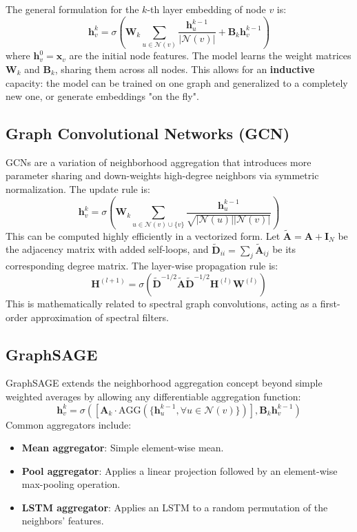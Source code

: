 The general formulation for the $k$-th layer embedding of node $v$ is:
\begin{equation}
    \mathbf{h}_v^k = \sigma \left( \mathbf{W}_k \sum_{u \in \mathcal{N}(v)} \frac{\mathbf{h}_u^{k-1}}{|\mathcal{N}(v)|} + \mathbf{B}_k \mathbf{h}_v^{k-1} \right)
\end{equation}
where $\mathbf{h}_v^0 = \mathbf{x}_v$ are the initial node features. The model learns the weight matrices $\mathbf{W}_k$ and $\mathbf{B}_k$, sharing them across all nodes. This allows for an \textbf{inductive} capacity: the model can be trained on one graph and generalized to a completely new one, or generate embeddings "on the fly".

\subsection{Graph Convolutional Networks (GCN)}
GCNs are a variation of neighborhood aggregation that introduces more parameter sharing and down-weights high-degree neighbors via symmetric normalization. The update rule is:
\begin{equation}
    \mathbf{h}_v^k = \sigma \left( \mathbf{W}_k \sum_{u \in \mathcal{N}(v) \cup \{v\}} \frac{\mathbf{h}_u^{k-1}}{\sqrt{|\mathcal{N}(u)| |\mathcal{N}(v)|}} \right)
\end{equation}
This can be computed highly efficiently in a vectorized form. Let $\tilde{\mathbf{A}} = \mathbf{A} + \mathbf{I}_N$ be the adjacency matrix with added self-loops, and $\tilde{\mathbf{D}}_{ii} = \sum_j \tilde{\mathbf{A}}_{ij}$ be its corresponding degree matrix. The layer-wise propagation rule is:
\begin{equation}
    \mathbf{H}^{(l+1)} = \sigma \left( \tilde{\mathbf{D}}^{-1/2} \tilde{\mathbf{A}} \tilde{\mathbf{D}}^{-1/2} \mathbf{H}^{(l)} \mathbf{W}^{(l)} \right)
\end{equation}
This is mathematically related to spectral graph convolutions, acting as a first-order approximation of spectral filters.

\subsection{GraphSAGE}
GraphSAGE extends the neighborhood aggregation concept beyond simple weighted averages by allowing any differentiable aggregation function:
\begin{equation}
    \mathbf{h}_v^k = \sigma \left( \left[ \mathbf{A}_k \cdot \text{AGG}(\{\mathbf{h}_u^{k-1}, \forall u \in \mathcal{N}(v)\}) \right] , \mathbf{B}_k \mathbf{h}_v^{k-1} \right)
\end{equation}
Common aggregators include:
\begin{itemize}
    \item \textbf{Mean aggregator}: Simple element-wise mean.
    \item \textbf{Pool aggregator}: Applies a linear projection followed by an element-wise max-pooling operation.
    \item \textbf{LSTM aggregator}: Applies an LSTM to a random permutation of the neighbors' features.
\end{itemize}

